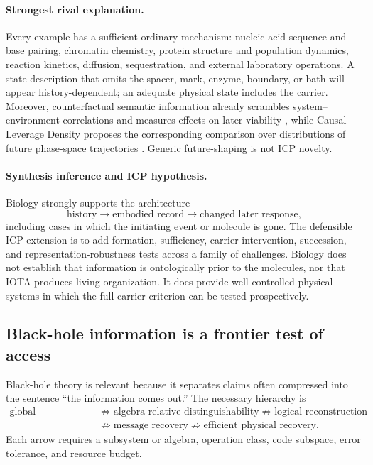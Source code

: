 \paragraph{Strongest rival explanation.}
Every example has a sufficient ordinary mechanism: nucleic-acid sequence and
base pairing, chromatin chemistry, protein structure and population dynamics,
reaction kinetics, diffusion, sequestration, and external laboratory
operations.  A state description that omits the spacer, mark, enzyme, boundary,
or bath will appear history-dependent; an adequate physical state includes the
carrier.  Moreover, counterfactual semantic information already scrambles
system--environment correlations and measures effects on later viability
\citep{KolchinskyWolpert2018Semantic}, while Causal Leverage Density proposes
the corresponding comparison over distributions of future phase-space
trajectories \citep{SowinskiEtAl2025CausalLeverage}.  Generic future-shaping is
not ICP novelty.

\paragraph{Synthesis inference and ICP hypothesis.}
Biology strongly supports the architecture
\begin{equation}
 \text{history}\rightarrow\text{embodied record}
 \rightarrow\text{changed later response},
\end{equation}
including cases in which the initiating event or molecule is gone.  The
defensible ICP extension is to add formation, sufficiency, carrier
intervention, succession, and representation-robustness tests across a family
of challenges.  Biology does not establish that information is ontologically
prior to the molecules, nor that IOTA produces living organization.  It does
provide well-controlled physical systems in which the full carrier criterion
can be tested prospectively.

\subsection{Black-hole information is a frontier test of access}

Black-hole theory is relevant because it separates claims often compressed
into the sentence ``the information comes out.''  The necessary hierarchy is
\begin{equation}
 \begin{split}
 \text{global preservation}
 &\not\Rightarrow \text{algebra-relative distinguishability}
 \not\Rightarrow \text{logical reconstruction}\\
 &\not\Rightarrow \text{message recovery}
 \not\Rightarrow \text{efficient physical recovery}.
 \end{split}
 \label{eq:black-hole-hierarchy}
\end{equation}
Each arrow requires a subsystem or algebra, operation class, code subspace,
error tolerance, and resource budget.

